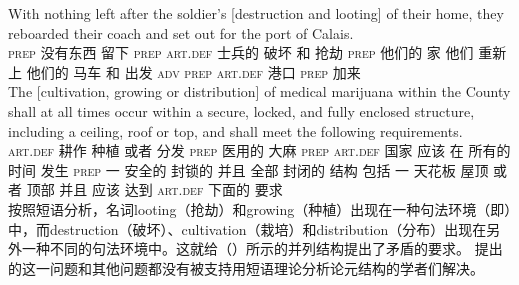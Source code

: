 \eal
\ex 
\gll With nothing left after the soldier's [destruction and looting] of their home, they reboarded their coach and set out for the port of Calais.\\
    \textsc{prep} 没有东西 留下 \textsc{prep} \textsc{art}.\textsc{def} 士兵的 \spacebr{}破坏 和 抢劫 \textsc{prep} 他们的 家 他们 重新上 他们的 马车 和 出发 \textsc{adv} \textsc{prep} \textsc{art}.\textsc{def} 港口 \textsc{prep} 加来\\
\ex  
\gll The [cultivation, growing or distribution] of medical marijuana within the County shall at all times occur within a secure, locked, and fully enclosed structure, including a ceiling, roof or top, and shall meet the following requirements.\\
    \textsc{art}.\textsc{def}  耕作 种植 或者 分发 \textsc{prep} 医用的 大麻 \textsc{prep} \textsc{art}.\textsc{def} 国家 应该 在 所有的 时间 发生 \textsc{prep} 一 安全的 封锁的 并且 全部 封闭的 结构 包括 一 天花板 屋顶 或者 顶部 并且 应该 达到 \textsc{art}.\textsc{def} 下面的 要求\\
\zl
    按照短语分析，名词looting（抢劫）和growing（种植）出现在一种句法环境（即\vPc ）中，而destruction（破坏）、cultivation（栽培）和distribution（分布）出现在另外一种不同的句法环境中。这就给（）所示的并列结构提出了矛盾的要求。 \citet{Wechsler2008a}提出的这一问题和其他问题都没有被支持用短语理论分析论元结构的学者们解决。
